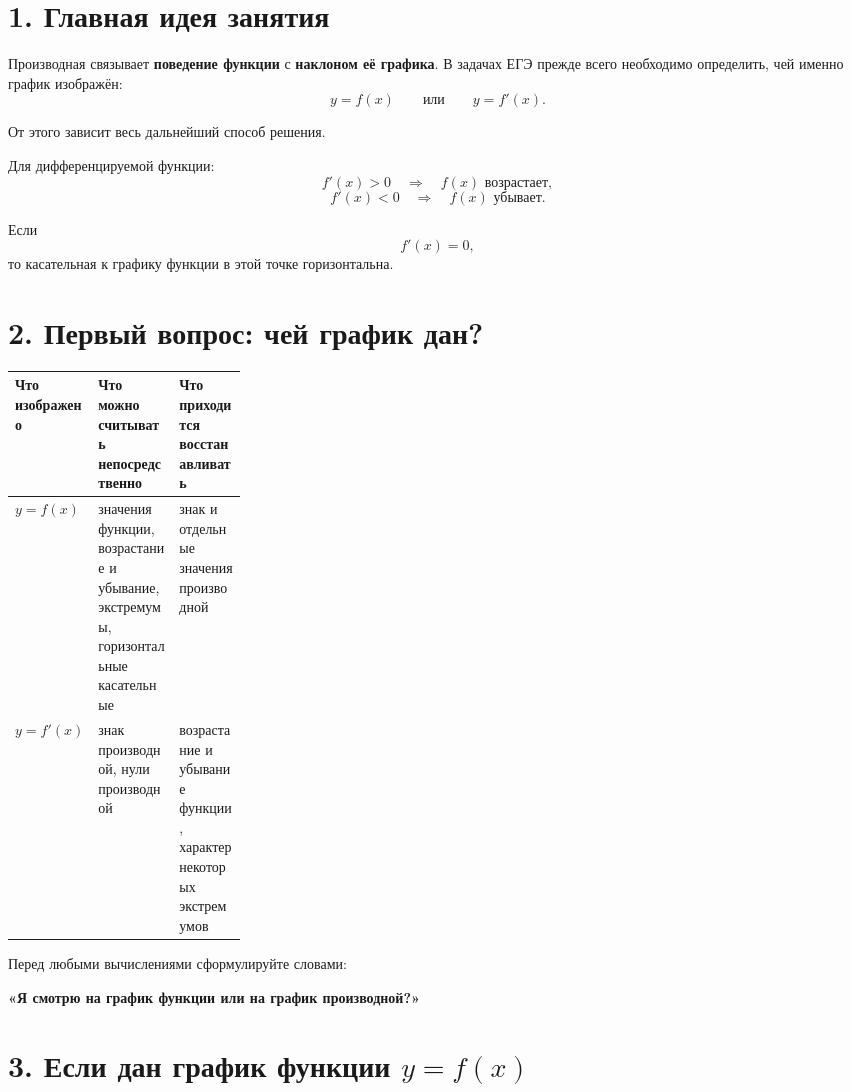 \documentclass[a4paper,12pt]{article}
\begin{document}
\section*{1. Главная идея занятия}

Производная связывает \textbf{поведение функции} с \textbf{наклоном её графика}.
В задачах ЕГЭ прежде всего необходимо определить, чей именно график изображён:
\[
y=f(x)
\qquad\text{или}\qquad
y=f'(x).
\]

От этого зависит весь дальнейший способ решения.

\begin{keybox}
Для дифференцируемой функции:
\[
f'(x)>0
\quad\Longrightarrow\quad
f(x)\text{ возрастает},
\]
\[
f'(x)<0
\quad\Longrightarrow\quad
f(x)\text{ убывает}.
\]

Если
\[
f'(x)=0,
\]
то касательная к графику функции в этой точке горизонтальна.
\end{keybox}

\section*{2. Первый вопрос: чей график дан?}

\begin{center}
\renewcommand{\arraystretch}{1.45}
\begin{tabularx}{\linewidth}{>{\bfseries}p{0.27\linewidth} X X}
\toprule
Что изображено & Что можно считывать непосредственно & Что приходится восстанавливать \\
\midrule
$y=f(x)$
&
значения функции, возрастание и убывание, экстремумы, горизонтальные касательные
&
знак и отдельные значения производной
\\
$y=f'(x)$
&
знак производной, нули производной
&
возрастание и убывание функции, характер некоторых экстремумов
\\
\bottomrule
\end{tabularx}
\end{center}

\begin{noticebox}
Перед любыми вычислениями сформулируйте словами:

\begin{center}
\textbf{«Я смотрю на график функции или на график производной?»}
\end{center}
\end{noticebox}

\section*{3. Если дан график функции \(y=f(x)\)}
\end{document}
